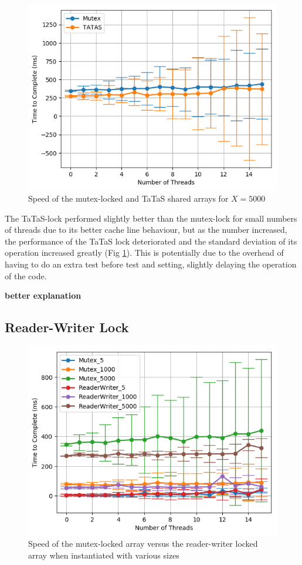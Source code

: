 \documentclass[11pt]{article}
\newcommand{\todo}[1]{\textbf{#1}}
\begin{document}
\begin{figure}\label{fig:step4_1}
\centering
\includegraphics[scale=0.65]{step4_1.png}
\caption{Speed of the mutex-locked and TaTaS shared arrays for $X=5000$}
\end{figure}


The TaTaS-lock performed slightly better than the mutex-lock for small numbers of threads due to its better cache line behaviour, but as the number increased, the performance of the TaTaS lock deteriorated and the standard deviation of its operation increased greatly (Fig \ref{fig:step4_1}).  This is potentially due to the overhead of having to do an extra test before test and setting, slightly delaying the operation of the code.

\todo{better explanation}

\subsection{Reader-Writer Lock}
\begin{figure}\label{fig:step5_1}
\centering
\includegraphics[scale=0.65]{step5_1.png}
\caption{Speed of the mutex-locked array versus the reader-writer locked array when instantiated with various sizes}
\end{figure}
\end{document}
